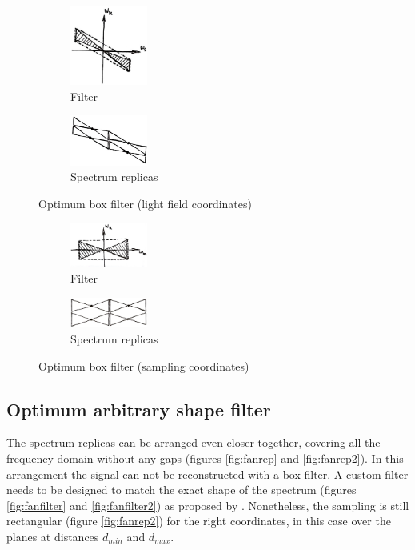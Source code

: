 \documentclass[acmtog,review,anonymous]{acmart}
\begin{document}
\begin{figure}[h]
  \centering
  \begin{subfigure}[t]{1in}
    \centering
    \includegraphics[width=1in]{figures/optfilter}
    \caption{Filter}\label{fig:optfilter}
  \end{subfigure}
  \quad
  \begin{subfigure}[t]{1in}
    \centering
    \includegraphics[width=1in]{figures/optrep}
    \caption{Spectrum replicas}\label{fig:optrep}
  \end{subfigure}
  \caption{Optimum box filter (light field coordinates)}\label{fig:opt}
\end{figure}

\begin{figure}[h]
  \centering
  \begin{subfigure}[t]{1in}
    \centering
    \includegraphics[width=1in]{figures/optfilter2}
    \caption{Filter}\label{fig:optfilter2}
  \end{subfigure}
  \quad
  \begin{subfigure}[t]{1in}
    \centering
    \includegraphics[width=1in]{figures/optrep2}
    \caption{Spectrum replicas}\label{fig:optrep2}
  \end{subfigure}
  \caption{Optimum box filter (sampling coordinates)}\label{fig:opt2}
\end{figure}

\subsection{Optimum arbitrary shape filter}

The spectrum replicas can be arranged even closer together, covering all the frequency domain without any gaps (figures \ref{fig:fanrep} and \ref{fig:fanrep2}). In this arrangement the signal can not be reconstructed with a box filter. A custom filter needs to be designed to match the exact shape of the spectrum (figures \ref{fig:fanfilter} and \ref{fig:fanfilter2}) as proposed by \cite{zhang2001generalized}. Nonetheless, the sampling is still rectangular (figure \ref{fig:fanrep2}) for the right coordinates, in this case over the planes at distances $d_{min}$ and $d_{max}$.
\end{document}

